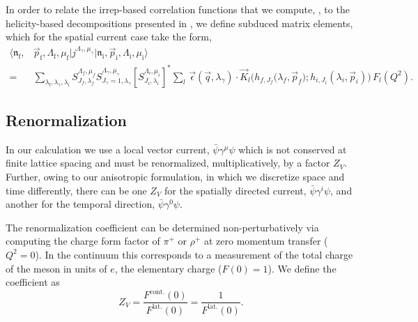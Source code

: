 In order to relate the irrep-based correlation functions that we compute, , to the helicity-based decompositions presented in , we define subduced matrix elements, which for the spatial current case take the form,
\begin{align}
\big\langle  \mathfrak{n}_\mathrm{f}, &\vec{p}_\mathrm{f}, \Lambda_\mathrm{f}, \mu_\mathrm{f} \big| j^{\Lambda_\gamma, \mu_\gamma} \big| \mathfrak{n}_\mathrm{i}, \vec{p}_\mathrm{i}, \Lambda_\mathrm{i}, \mu_\mathrm{i} \big\rangle  \nonumber \\
	= &\sum_{\lambda_\mathrm{f}, \lambda_\gamma, \lambda_\mathrm{i}} S^{\Lambda_f, \mu_f}_{J_f,\lambda_f}  S^{\Lambda_\gamma ,\mu_\gamma}_{J_\gamma =1 ,\lambda_\gamma}  \left[S^{\Lambda_i ,\mu_i}_{J_i,\lambda_i}\right]^*  \sum\nolimits_l \, \vec{\epsilon}(\vec{q},\lambda_\gamma) \cdot \vec{K}_l\big(h_{f,J_f}\big(\lambda_f,\vec{p}_f); h_{i,J_i}(\lambda_i,\vec{p}_i) \big) \, F_l(Q^2).  \label{eqn::subduced_decomp}
\end{align}


\subsection{Renormalization} \label{sec::Renormalization}
In our calculation we use a local vector current, $\bar{\psi}\gamma^\mu\psi$ which is not conserved at finite lattice spacing and must be renormalized, multiplicatively, by a factor $Z_V$. Further, owing to our anisotropic formulation, in which we discretize space and time differently, there can be one $Z_V$ for the spatially directed current, $\bar{\psi} \gamma^i\psi$, and another for the temporal direction, $\bar{\psi}\gamma^0\psi$.   

The renormalization coefficient can be determined non-perturbatively via computing the charge form factor of $\pi^+$ or $\rho^+$ at zero momentum transfer ($Q^2 = 0$). In the continuum this corresponds to a measurement of the total charge of the meson in units of $e$, the elementary charge ($F(0)=1$). We define the coefficient as 
\begin{equation}
Z_V = \frac{F^{\mathrm{cont.}}(0)}{F^{\mathrm{lat.}}(0)} = \frac{1}{F^{\mathrm{lat.}}(0)}. 
\end{equation}

